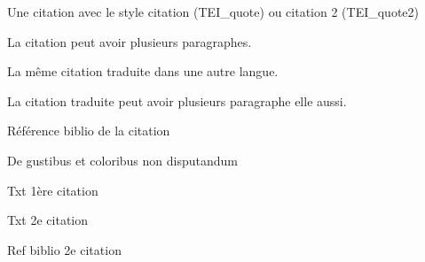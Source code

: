 \documentclass[12pt,twoside,openany]{book}
\newenvironment{lateiDocument}{}{}
\begin{document}
\begin{lateiDocument}
\begin{teiElement}[name={TEI}]
\begin{teiElement}[name={text},xmlid={text-001}]
\begin{teiElement}[name={body},xmlid={body-001}]
\begin{teiDiv}[type={section1},xmlid={section1-004}]
\begin{teiDiv}[type={section2},xmlid={section2-004}]
\begin{teiCit}[xmlid={cit3}]
						\begin{teiQuote}
Une citation avec le style citation (TEI\_quote) ou citation 2 (TEI\_quote2)
\end{teiQuote}
						\begin{teiQuote}
La citation peut avoir plusieurs paragraphes.
\end{teiQuote}
						\begin{teiQuote}[xmllang={en},type={trl}]
La même citation traduite dans une autre langue.
\end{teiQuote}
						\begin{teiQuote}[xmllang={en},type={trl}]
La citation traduite peut avoir plusieurs paragraphe elle aussi.
\end{teiQuote}
						\begin{teiBibl}[xmlid={bibl-008}]
Référence biblio de la citation
\end{teiBibl}
					
\end{teiCit}
					\begin{teiCit}[xmlid={cit4}]

						\begin{teiQuote}[xmllang={es}]
De gustibus et coloribus non disputandum
\end{teiQuote}
					
\end{teiCit}
				
\end{teiDiv}
				\begin{teiDiv}[type={section2},xmlid={section2-005}]

					\begin{teiCit}[xmlid={cit5}]

						\begin{teiQuote}
Txt 1ère citation
\end{teiQuote}
					
\end{teiCit}
					\begin{teiCit}[xmlid={cit6}]

						\begin{teiQuote}
Txt 2e citation
\end{teiQuote}
						\begin{teiBibl}[xmlid={bibl-009}]
Ref biblio 2e citation
\end{teiBibl}
					

\end{teiCit}
\end{teiDiv}
\end{teiDiv}
\end{teiElement}
\end{teiElement}
\end{teiElement}
\end{lateiDocument}
\end{document}
